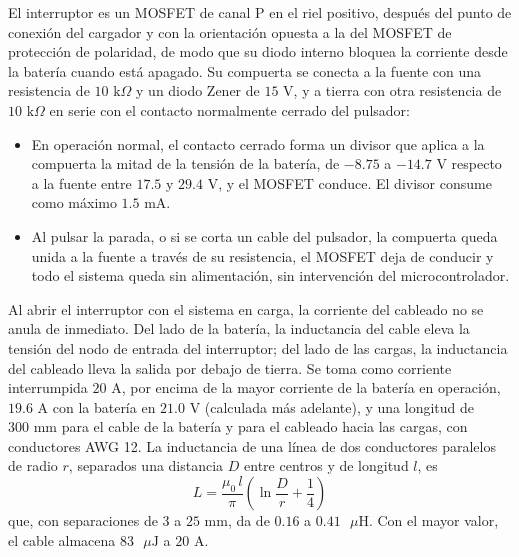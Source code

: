 \documentclass[../../General.tex]{subfiles}
\begin{document}
El interruptor es un MOSFET de canal P en el riel positivo, después del punto de conexión del cargador y con la orientación opuesta a la del MOSFET de protección de polaridad, de modo que su diodo interno bloquea la corriente desde la batería cuando está apagado. Su compuerta se conecta a la fuente con una resistencia de $10\text{ k}\Omega$ y un diodo Zener de $15\text{ V}$, y a tierra con otra resistencia de $10\text{ k}\Omega$ en serie con el contacto normalmente cerrado del pulsador:
\begin{itemize}
    \item En operación normal, el contacto cerrado forma un divisor que aplica a la compuerta la mitad de la tensión de la batería, de $-8.75$ a $-14.7\text{ V}$ respecto a la fuente entre $17.5$ y $29.4\text{ V}$, y el MOSFET conduce. El divisor consume como máximo $1.5\text{ mA}$.
    \item Al pulsar la parada, o si se corta un cable del pulsador, la compuerta queda unida a la fuente a través de su resistencia, el MOSFET deja de conducir y todo el sistema queda sin alimentación, sin intervención del microcontrolador.
\end{itemize}

Al abrir el interruptor con el sistema en carga, la corriente del cableado no se anula de inmediato. Del lado de la batería, la inductancia del cable eleva la tensión del nodo de entrada del interruptor; del lado de las cargas, la inductancia del cableado lleva la salida por debajo de tierra. Se toma como corriente interrumpida $20\text{ A}$, por encima de la mayor corriente de la batería en operación, $19.6\text{ A}$ con la batería en $21.0\text{ V}$ (calculada más adelante), y una longitud de $300\text{ mm}$ para el cable de la batería y para el cableado hacia las cargas, con conductores AWG 12. La inductancia de una línea de dos conductores paralelos de radio $r$, separados una distancia $D$ entre centros y de longitud $l$, es
\begin{equation}
L = \frac{\mu_0\, l}{\pi}\left(\ln\frac{D}{r} + \frac{1}{4}\right)
\end{equation}
que, con separaciones de $3$ a $25\text{ mm}$, da de $0.16$ a $0.41\text{ }\mu\text{H}$. Con el mayor valor, el cable almacena $83\text{ }\mu\text{J}$ a $20\text{ A}$.
\end{document}
